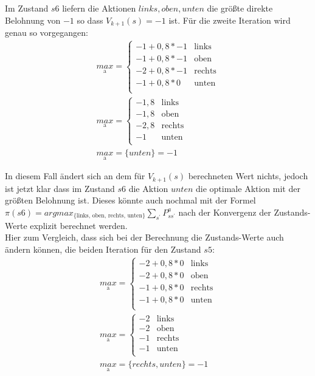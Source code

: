 \documentclass[10pt]{scrartcl}
\begin{document}
Im Zustand $s6$ liefern die Aktionen $ links, oben, unten$ die größte direkte Belohnung von $-1$ so dass $V_{k+1}(s) = -1$ ist.
Für die zweite Iteration wird genau so vorgegangen:
\begin{align}
	\underset{\text{a}}{max} = \begin{cases} 
		-1 + 0,8 * -1 & \text{links} \\ 
		-1 + 0,8 * -1 & \text{oben} \\
		-2 + 0,8 * -1 & \text{rechts} \\
		-1 + 0,8 * 0 &  \text{unten} \\ 
 	\end{cases}\\
 	\underset{\text{a}}{max} = \begin{cases} 
		-1,8 & \text{links} \\ 
		-1,8 & \text{oben} \\
		-2,8 & \text{rechts} \\
		-1 & \text{unten} \\ 
 	\end{cases}\\
 	\underset{\text{a}}{max} = \{ unten \} = -1
\end{align}

In diesem Fall ändert sich an dem für $V_{k+1}(s)$ berechneten Wert nichts, jedoch ist jetzt klar dass im Zustand $s6$ die Aktion $unten$ die optimale Aktion mit der größten Belohnung ist.
Dieses könnte auch nochmal mit der Formel $\pi(s6) = argmax_{\text{\{links, oben, rechts, unten\}}} \sum_{s^{'}} P^a_{ss^{'}}$ nach der Konvergenz der Zustands-Werte explizit berechnet werden.\\
Hier zum Vergleich, dass sich bei der Berechnung die Zustands-Werte auch ändern können, die beiden Iteration für den Zustand $s5$:
\begin{align}
	\underset{\text{a}}{max} = \begin{cases} 
		-2 + 0,8 * 0 & \text{links} \\ 
		-2 + 0,8 * 0 & \text{oben} \\
		-1 + 0,8 * 0 & \text{rechts} \\
		-1 + 0,8 * 0 & \text{unten} \\ 
 	\end{cases}\\
 	\underset{\text{a}}{max} = \begin{cases} 
		-2 & \text{links} \\ 
		-2 & \text{oben} \\
		-1 & \text{rechts} \\
		-1 & \text{unten} \\ 
 	\end{cases}\\
 	\underset{\text{a}}{max} = \{ rechts, unten \} = -1
\end{align}
\end{document}
